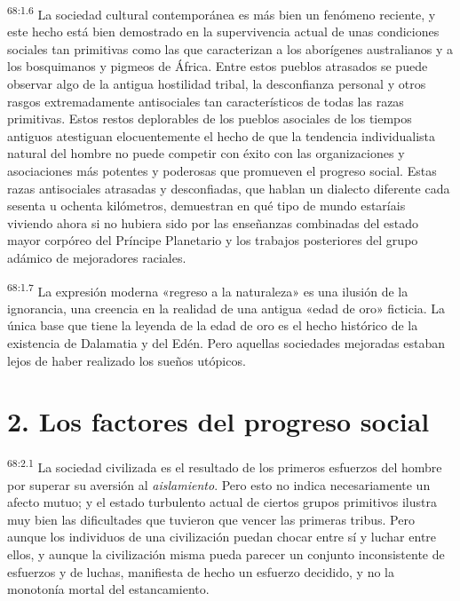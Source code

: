 \par
\textsuperscript{68:1.6} La sociedad cultural contemporánea es más bien un fenómeno reciente, y este hecho está bien demostrado en la supervivencia actual de unas condiciones sociales tan primitivas como las que caracterizan a los aborígenes australianos y a los bosquimanos y pigmeos de África. Entre estos pueblos atrasados se puede observar algo de la antigua hostilidad tribal, la desconfianza personal y otros rasgos extremadamente antisociales tan característicos de todas las razas primitivas. Estos restos deplorables de los pueblos asociales de los tiempos antiguos atestiguan elocuentemente el hecho de que la tendencia individualista natural del hombre no puede competir con éxito con las organizaciones y asociaciones más potentes y poderosas que promueven el progreso social. Estas razas antisociales atrasadas y desconfiadas, que hablan un dialecto diferente cada sesenta u ochenta kilómetros, demuestran en qué tipo de mundo estaríais viviendo ahora si no hubiera sido por las enseñanzas combinadas del estado mayor corpóreo del Príncipe Planetario y los trabajos posteriores del grupo adámico de mejoradores raciales.

\par
\textsuperscript{68:1.7} La expresión moderna «regreso a la naturaleza» es una ilusión de la ignorancia, una creencia en la realidad de una antigua «edad de oro» ficticia. La única base que tiene la leyenda de la edad de oro es el hecho histórico de la existencia de Dalamatia y del Edén. Pero aquellas sociedades mejoradas estaban lejos de haber realizado los sueños utópicos.

\section*{2. Los factores del progreso social}
\par
\textsuperscript{68:2.1} La sociedad civilizada es el resultado de los primeros esfuerzos del hombre por superar su aversión al \textit{aislamiento}. Pero esto no indica necesariamente un afecto mutuo; y el estado turbulento actual de ciertos grupos primitivos ilustra muy bien las dificultades que tuvieron que vencer las primeras tribus. Pero aunque los individuos de una civilización puedan chocar entre sí y luchar entre ellos, y aunque la civilización misma pueda parecer un conjunto inconsistente de esfuerzos y de luchas, manifiesta de hecho un esfuerzo decidido, y no la monotonía mortal del estancamiento.

